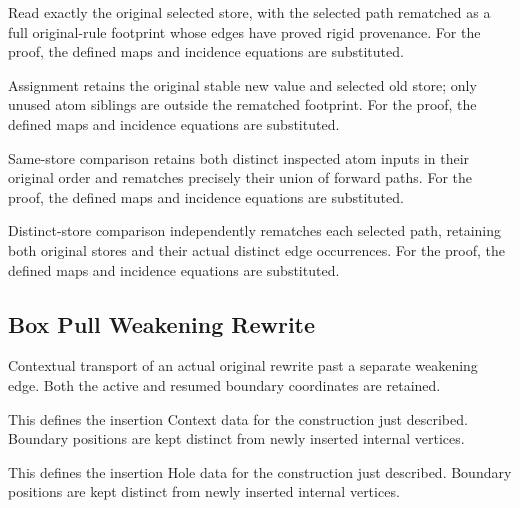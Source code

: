 Read exactly the original selected store, with the selected path rematched as a full original-rule footprint whose edges have proved rigid provenance.
For the proof, the defined maps and incidence equations are substituted.
\par{}

Assignment retains the original stable new value and selected old store; only unused atom siblings are outside the rematched footprint.
For the proof, the defined maps and incidence equations are substituted.
\par{}

Same-store comparison retains both distinct inspected atom inputs in their original order and rematches precisely their union of forward paths.
For the proof, the defined maps and incidence equations are substituted.
\par{}

Distinct-store comparison independently rematches each selected path, retaining both original stores and their actual distinct edge occurrences.
For the proof, the defined maps and incidence equations are substituted.
\par{}

\subsection{Box Pull Weakening Rewrite}
Contextual transport of an actual original rewrite past a separate weakening edge. Both the active and resumed boundary coordinates are retained.

This defines the insertion Context data for the construction just described. Boundary positions are kept distinct from newly inserted internal vertices.
\par{}

This defines the insertion Hole data for the construction just described. Boundary positions are kept distinct from newly inserted internal vertices.
\par{}

